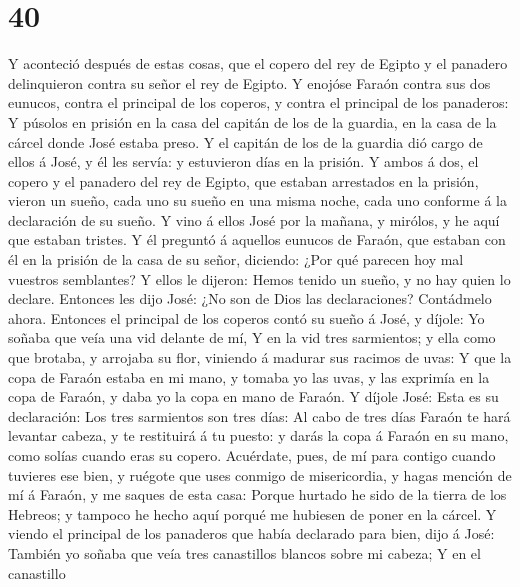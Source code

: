 \hypertarget{section-39}{%
\section{40}\label{section-39}}

 Y aconteció después de estas cosas, que el copero del rey
de Egipto y el panadero delinquieron contra su señor el rey de Egipto.
 Y enojóse Faraón contra sus dos eunucos, contra el
principal de los coperos, y contra el principal de los panaderos:
 Y púsolos en prisión en la casa del capitán de los de la
guardia, en la casa de la cárcel donde José estaba preso. 
Y el capitán de los de la guardia dió cargo de ellos á José, y él les
servía: y estuvieron días en la prisión.  Y ambos á dos,
el copero y el panadero del rey de Egipto, que estaban arrestados en la
prisión, vieron un sueño, cada uno su sueño en una misma noche, cada uno
conforme á la declaración de su sueño.  Y vino á ellos
José por la mañana, y mirólos, y he aquí que estaban tristes.
 Y él preguntó á aquellos eunucos de Faraón, que estaban
con él en la prisión de la casa de su señor, diciendo: ¿Por qué parecen
hoy mal vuestros semblantes?  Y ellos le dijeron: Hemos
tenido un sueño, y no hay quien lo declare. Entonces les dijo José: ¿No
son de Dios las declaraciones? Contádmelo ahora.  Entonces
el principal de los coperos contó su sueño á José, y díjole: Yo soñaba
que veía una vid delante de mí,  Y en la vid tres
sarmientos; y ella como que brotaba, y arrojaba su flor, viniendo á
madurar sus racimos de uvas:  Y que la copa de Faraón
estaba en mi mano, y tomaba yo las uvas, y las exprimía en la copa de
Faraón, y daba yo la copa en mano de Faraón.  Y díjole
José: Esta es su declaración: Los tres sarmientos son tres días:
 Al cabo de tres días Faraón te hará levantar cabeza, y
te restituirá á tu puesto: y darás la copa á Faraón en su mano, como
solías cuando eras su copero.  Acuérdate, pues, de mí
para contigo cuando tuvieres ese bien, y ruégote que uses conmigo de
misericordia, y hagas mención de mí á Faraón, y me saques de esta casa:
 Porque hurtado he sido de la tierra de los Hebreos; y
tampoco he hecho aquí porqué me hubiesen de poner en la cárcel.
 Y viendo el principal de los panaderos que había
declarado para bien, dijo á José: También yo soñaba que veía tres
canastillos blancos sobre mi cabeza;  Y en el canastillo
